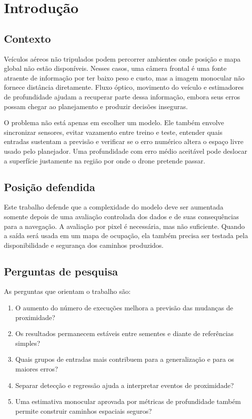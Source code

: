 \chapter{Introdução}\label{cap:introducao}

\section{Contexto}

Veículos aéreos não tripulados podem percorrer ambientes onde posição e mapa global não estão disponíveis. Nesses casos, uma câmera frontal é uma fonte atraente de informação por ter baixo peso e custo, mas a imagem monocular não fornece distância diretamente. Fluxo óptico, movimento do veículo e estimadores de profundidade ajudam a recuperar parte dessa informação, embora seus erros possam chegar ao planejamento e produzir decisões inseguras.

O problema não está apenas em escolher um modelo. Ele também envolve sincronizar sensores, evitar vazamento entre treino e teste, entender quais entradas sustentam a previsão e verificar se o erro numérico altera o espaço livre usado pelo planejador. Uma profundidade com erro médio aceitável pode deslocar a superfície justamente na região por onde o drone pretende passar.

\section{Posição defendida}

Este trabalho defende que a complexidade do modelo deve ser aumentada somente depois de uma avaliação controlada dos dados e de suas consequências para a navegação. A avaliação por pixel é necessária, mas não suficiente. Quando a saída será usada em um mapa de ocupação, ela também precisa ser testada pela disponibilidade e segurança dos caminhos produzidos.

\section{Perguntas de pesquisa}

As perguntas que orientam o trabalho são:

\begin{enumerate}
    \item O aumento do número de execuções melhora a previsão das mudanças de proximidade?
    \item Os resultados permanecem estáveis entre sementes e diante de referências simples?
    \item Quais grupos de entradas mais contribuem para a generalização e para os maiores erros?
    \item Separar detecção e regressão ajuda a interpretar eventos de proximidade?
    \item Uma estimativa monocular aprovada por métricas de profundidade também permite construir caminhos espaciais seguros?
\end{enumerate}

